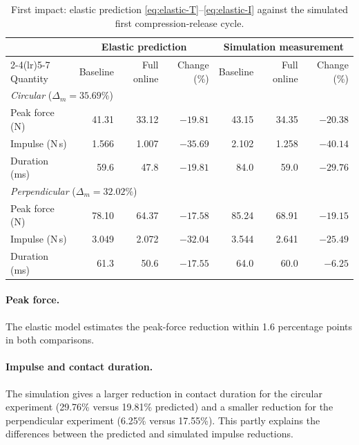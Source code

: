 \documentclass[12pt,a4paper]{article}
\begin{document}
\begin{table}[htbp]
  \centering
  \small
  \setlength{\tabcolsep}{5pt}
  \begin{tabular}{lrrrrrr}
    \toprule
     & \multicolumn{3}{c}{Elastic prediction}
     & \multicolumn{3}{c}{Simulation measurement} \\
    \cmidrule(lr){2-4}\cmidrule(lr){5-7}
    Quantity & Baseline & Full online & Change (\%)
             & Baseline & Full online & Change (\%) \\
    \midrule
    \multicolumn{7}{l}{\emph{Circular} ($\Delta_m = 35.69\%$)} \\
    Peak force (N)     & 41.31 & 33.12 & $-19.81$ & 43.15 & 34.35 & $-20.38$ \\
    Impulse (N\,s)     & 1.566 & 1.007 & $-35.69$ & 2.102 & 1.258 & $-40.14$ \\
    Duration (ms)      & 59.6  & 47.8  & $-19.81$ & 84.0  & 59.0  & $-29.76$ \\
    \midrule
    \multicolumn{7}{l}{\emph{Perpendicular} ($\Delta_m = 32.02\%$)} \\
    Peak force (N)     & 78.10 & 64.37 & $-17.58$ & 85.24 & 68.91 & $-19.15$ \\
    Impulse (N\,s)     & 3.049 & 2.072 & $-32.04$ & 3.544 & 2.641 & $-25.49$ \\
    Duration (ms)      & 61.3  & 50.6  & $-17.55$ & 64.0  & 60.0  & $-6.25$ \\
    \bottomrule
  \end{tabular}
  \caption{First impact: elastic prediction \eqref{eq:elastic-T}--\eqref{eq:elastic-I}
  against the simulated first compression-release cycle.}
  \label{tab:elastic-compare}
\end{table}

\paragraph{Peak force.}
The elastic model estimates the peak-force reduction within 1.6 percentage points
in both comparisons.

\paragraph{Impulse and contact duration.}
The simulation gives a larger reduction in contact duration for the circular
experiment (29.76\% versus 19.81\% predicted) and a smaller reduction for the
perpendicular experiment (6.25\% versus 17.55\%). This partly explains the
differences between the predicted and simulated impulse reductions.
\end{document}
